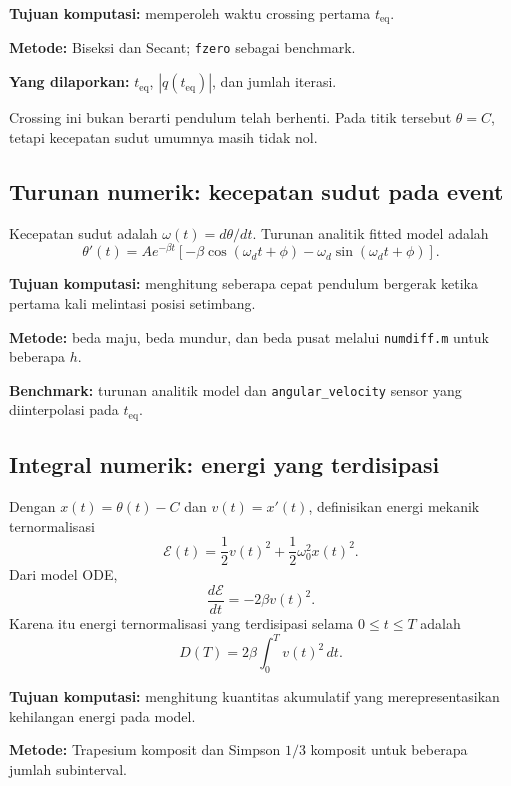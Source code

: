 \documentclass[book,english,noindex,lean,nobackpage,nocopyright,noupdate,nofiglist,notablist]{enacom}
\begin{document}
\textbf{Tujuan komputasi:} memperoleh waktu crossing pertama $t_{\mathrm{eq}}$.

\textbf{Metode:} Biseksi dan Secant; \texttt{fzero} sebagai benchmark.

\textbf{Yang dilaporkan:} $t_{\mathrm{eq}}$, $|q(t_{\mathrm{eq}})|$, dan jumlah iterasi.

Crossing ini bukan berarti pendulum telah berhenti. Pada titik tersebut $\theta=\hat C$, tetapi kecepatan sudut umumnya masih tidak nol.

\subsection{Turunan numerik: kecepatan sudut pada event}
Kecepatan sudut adalah $\omega(t)=d\theta/dt$. Turunan analitik fitted model adalah
\begin{equation}
\theta'(t)=A e^{-\beta t}\left[-\beta\cos(\omega_dt+\phi)-\omega_d\sin(\omega_dt+\phi)\right].
\end{equation}

\textbf{Tujuan komputasi:} menghitung seberapa cepat pendulum bergerak ketika pertama kali melintasi posisi setimbang.

\textbf{Metode:} beda maju, beda mundur, dan beda pusat melalui \texttt{numdiff.m} untuk beberapa $h$.

\textbf{Benchmark:} turunan analitik model dan \texttt{angular\_velocity} sensor yang diinterpolasi pada $t_{\mathrm{eq}}$.

\subsection{Integral numerik: energi yang terdisipasi}
Dengan $x(t)=\theta(t)-C$ dan $v(t)=x'(t)$, definisikan energi mekanik ternormalisasi
\begin{equation}
\mathcal E(t)=\frac12v(t)^2+\frac12\omega_0^2x(t)^2.
\end{equation}
Dari model ODE,
\[
\frac{d\mathcal E}{dt}=-2\beta v(t)^2.
\]
Karena itu energi ternormalisasi yang terdisipasi selama $0\le t\le T$ adalah
\begin{equation}
D(T)=2\beta\int_0^T v(t)^2\,dt.
\end{equation}

\textbf{Tujuan komputasi:} menghitung kuantitas akumulatif yang merepresentasikan kehilangan energi pada model.

\textbf{Metode:} Trapesium komposit dan Simpson $1/3$ komposit untuk beberapa jumlah subinterval.
\end{document}
